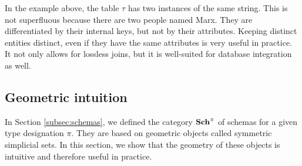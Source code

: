 \documentclass{amsart}
\def\Sch{{\bf Sch}}
\begin{document}
In the example above, the table $\tau$ has two instances of the same string.  This is not superfluous because there are two people named Marx.  They are differentiated by their internal keys, but not by their attributes.  Keeping distinct entities distinct, even if they have the same attributes is very useful in practice.  It not only allows for lossless joins, but it is well-suited for database integration as well.

\subsection{Geometric intuition}\label{subsec:geometric}

In Section \ref{subsec:schemas}, we defined the category $\Sch^\pi$ of schemas for a given type designation $\pi$.  They are based on geometric objects called symmetric simplicial sets.  In this section, we show that the geometry of these objects is intuitive and therefore useful in practice.
\end{document}
